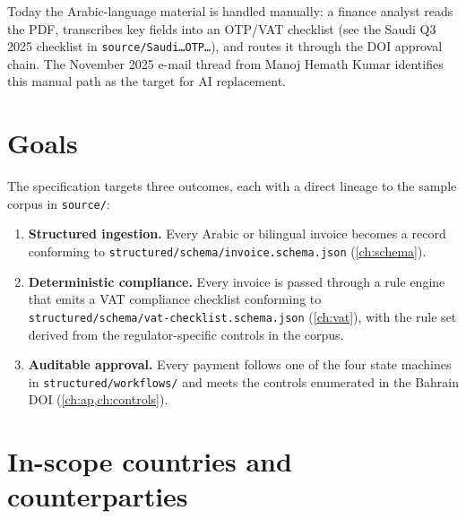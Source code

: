 \documentclass[11pt,a4paper,twoside]{report}
\newcommand{\corpus}{}
\begin{document}
Today the Arabic-language material is handled manually: a finance analyst
reads the PDF, transcribes key fields into an OTP/VAT checklist (see the
Saudi Q3 2025 checklist in \corpus\texttt{source/Saudi\ldots OTP\ldots}),
and routes it through the DOI approval chain. The November 2025 e-mail
thread from Manoj Hemath Kumar identifies this manual path as the target
for AI replacement.

\section{Goals}

The specification targets three outcomes, each with a direct lineage to
the sample corpus in \corpus\texttt{source/}:

\begin{enumerate}
  \item \textbf{Structured ingestion.} Every Arabic or bilingual invoice
        becomes a record conforming to
        \texttt{structured/schema/invoice.schema.json}
        (\cref{ch:schema}).
  \item \textbf{Deterministic compliance.} Every invoice is passed
        through a rule engine that emits a VAT compliance checklist
        conforming to \texttt{structured/schema/vat-checklist.schema.json}
        (\cref{ch:vat}), with the rule set derived from the
        regulator-specific controls in the corpus.
  \item \textbf{Auditable approval.} Every payment follows one of the
        four state machines in \corpus\texttt{structured/workflows/} and
        meets the controls enumerated in the Bahrain DOI
        (\cref{ch:ap,ch:controls}).
\end{enumerate}

\section{In-scope countries and counterparties}
\end{document}
